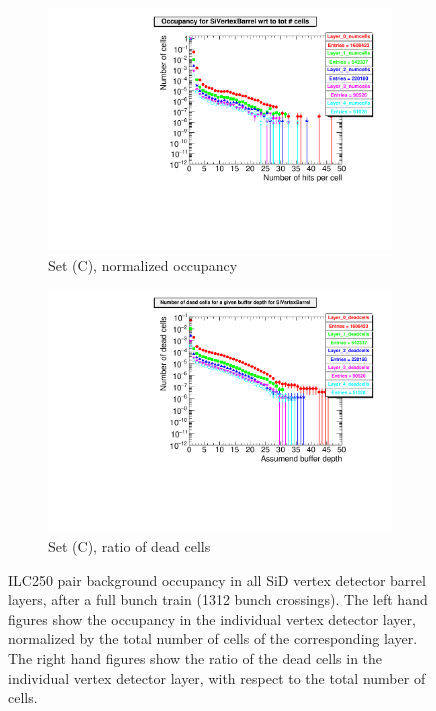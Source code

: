 \begin{figure}[htb]
\begin{subfigure}[b]{0.49\textwidth}
   \centering
    \includegraphics[width=\textwidth]{Figures/Pairs/Appendix/occupancy_numcells_SiVertexBarrel_ILC250_SetC_corrected_Barrel_size.pdf}
   \caption{Set (C), normalized occupancy}
   \end{subfigure}
   \hfill
    \begin{subfigure}[b]{0.49\textwidth}
   \centering
   \includegraphics[width=\textwidth]{Figures/Pairs/Appendix/occupancy_deadcells_SiVertexBarrel_ILC250_SetC_corrected_Barrel_size.pdf}
   \caption{Set (C), ratio of dead cells}
   \end{subfigure}
   \caption[Pair background occupancy in all SiD vertex detector barrel layers for the ILC250]{ILC250 pair background occupancy in all SiD vertex detector barrel layers, after a full bunch train (1312 bunch crossings).
   The left hand figures show the occupancy in the individual vertex detector layer, normalized by the total number of cells of the corresponding layer.
   The right hand figures show the ratio of the dead cells in the individual vertex detector layer, with respect to the total number of cells.
   }
   \label{fig:PairBkg:ILC250_Occupancy_Layers_VXDBarrel}
 \end{figure}
 
